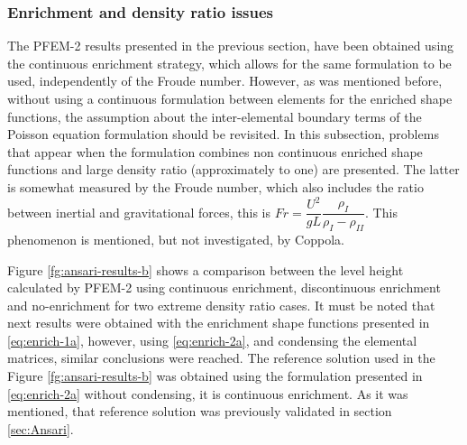 \subsubsection{Enrichment and density ratio issues}

The PFEM-2 results presented in the previous section, have been obtained using the continuous enrichment strategy, which allows for the same formulation to be used, independently of the Froude number. However, as was mentioned before, without using a continuous formulation between elements for the enriched shape functions, the assumption about the inter-elemental boundary terms of the Poisson equation formulation should be revisited. In this subsection, problems that appear when the formulation combines non continuous enriched shape functions and large density ratio (approximately to one) are presented. The latter is somewhat measured by the Froude number, which also includes the ratio between inertial and gravitational forces, this is $Fr = \dfrac{U^2}{gL}\dfrac{\rho_I}{\rho_I-\rho_{II}}$. This phenomenon is mentioned, but not investigated, by Coppola\cite{Coppola05}.

Figure \ref{fg:ansari-results-b} shows a comparison between the level height calculated by PFEM-2 using continuous enrichment, discontinuous enrichment and no-enrichment for two extreme density ratio cases. It must be noted that next results were obtained with the enrichment shape functions presented in \ref{eq:enrich-1a}, however, using \ref{eq:enrich-2a}, and condensing the elemental matrices, similar conclusions were reached. The reference solution used in the Figure \ref{fg:ansari-results-b} was obtained using the formulation presented in \ref{eq:enrich-2a} without condensing, it is continuous enrichment. As it was mentioned, that reference solution was previously validated in section \ref{sec:Ansari}.


